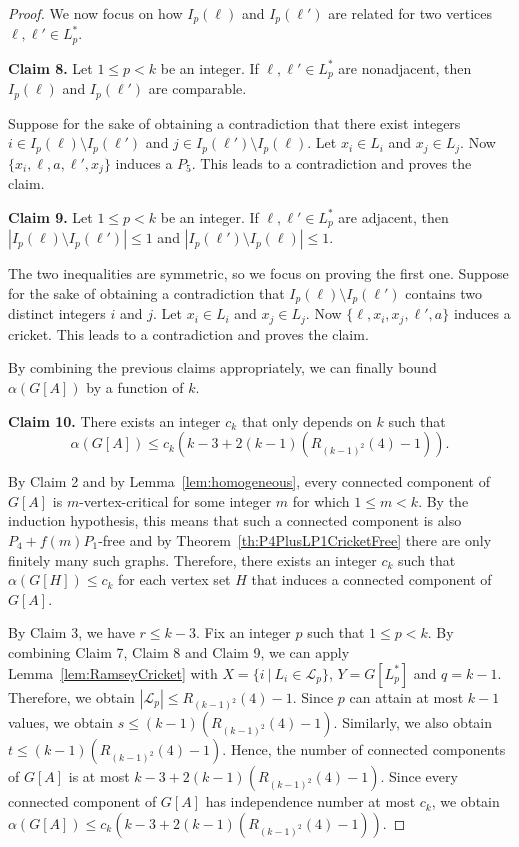 \documentclass[10pt]{article}
\theoremstyle{definition}
\begin{document}
\begin{proof}
\noindent

We now focus on how $I_p(\ell)$ and $I_p(\ell')$ are related for two vertices $\ell,\ell'\in L_p^*$.

\bigskip

\noindent \textbf{Claim 8.} Let $1 \leq p<k$ be an integer. If $\ell,\ell'\in L_p^*$ are nonadjacent, then $I_p(\ell)$ and $I_p(\ell')$ are comparable.

\bigskip

Suppose for the sake of obtaining a contradiction that there exist integers $i\in I_p(\ell)\setminus I_p(\ell')$ and $j\in I_p(\ell')\setminus I_p(\ell)$. Let $x_i\in L_i$ and $x_j\in L_j$. Now $\{x_i, \ell, a, \ell',x_j\}$ induces a $P_5$. This leads to a contradiction and proves the claim.

\bigskip

\noindent \textbf{Claim 9.} Let $1 \leq p<k$ be an integer. If $\ell,\ell'\in L_p^*$ are adjacent, then $|I_p(\ell) \setminus I_p(\ell')| \leq 1$ and $|I_p(\ell') \setminus I_p(\ell)| \leq 1$.

\bigskip

The two inequalities are symmetric, so we focus on proving the first one. Suppose for the sake of obtaining a contradiction that $I_p(\ell) \setminus I_p(\ell')$ contains two distinct integers $i$ and $j$. Let $x_i\in L_i$ and $x_j\in L_j$. Now $\{\ell,x_i,x_j,\ell',a\}$ induces a cricket. This leads to a contradiction and proves the claim.

\bigskip

\noindent

By combining the previous claims appropriately, we can finally bound $\alpha(G[A])$ by a function of $k$.

\noindent \textbf{Claim 10.} There exists an integer $c_k$ that only depends on $k$ such that 
$$\alpha(G[A]) \leq c_k\left(k-3+2(k-1)(R_{(k-1)^2}(4)-1)\right).$$

\bigskip


By Claim 2 and by Lemma~\ref{lem:homogeneous}, every connected component of $G[A]$ is $m$-vertex-critical for some integer $m$ for which $1 \leq m < k$. By the induction hypothesis, this means that such a connected component is also $P_4+f(m)P_1$-free and by Theorem~\ref{th:P4PlusLP1CricketFree} there are only finitely many such graphs. Therefore, there exists an integer $c_k$ such that $\alpha(G[H]) \leq c_k$ for each vertex set $H$ that induces a connected component of $G[A]$.

By Claim 3, we have $r \leq k-3$. Fix an integer $p$ such that $1 \leq p<k$. By combining Claim 7, Claim 8 and Claim 9, we can apply Lemma~\ref{lem:RamseyCricket} with $X=\{i~|~L_i\in\mathcal{L}_p\}$, $Y=G[L_p^*]$ and $q=k-1$. Therefore, we obtain $|\mathcal{L}_p|\leq R_{(k-1)^2}(4)-1$. Since $p$ can attain at most $k-1$ values, we obtain $s \leq (k-1)(R_{(k-1)^2}(4)-1)$. Similarly, we also obtain $t \leq (k-1)(R_{(k-1)^2}(4)-1)$. Hence, the number of connected components of $G[A]$ is at most $k-3+2(k-1)(R_{(k-1)^2}(4)-1)$. Since every connected component of $G[A]$ has independence number at most $c_k$, we obtain $\alpha(G[A]) \leq c_k\left(k-3+2(k-1)(R_{(k-1)^2}(4)-1)\right)$.

\end{proof}
\end{document}
